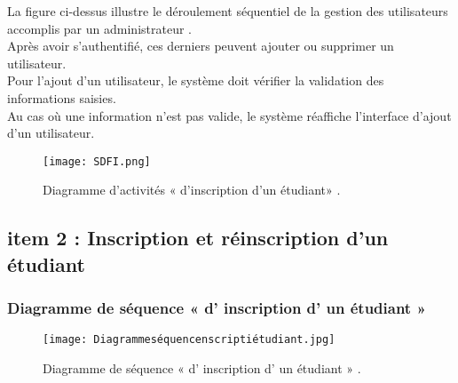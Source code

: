 La figure ci-dessus illustre le déroulement séquentiel de la gestion des utilisateurs accomplis par
un administrateur .\\
Après avoir s’authentifié, ces derniers peuvent ajouter ou supprimer un utilisateur.\\
Pour l’ajout d’un utilisateur, le système doit vérifier la validation des informations saisies.\\
 Au cas où une information n’est pas valide, le système réaffiche l’interface d’ajout d’un utilisateur.
 \begin{figure}[ht]
 	\centering
 	\texttt{[image: SDFI.png]}
 	\caption{Diagramme d'activités « d'inscription d'un étudiant» .}
 	\label{fig:Diagramme d' activités  d' inscription d'un étudiant   }
 \end{figure}
 \FloatBarrier
\clearpage
\subsection{item 2 : Inscription et réinscription d'un étudiant}
\subsubsection{Diagramme de séquence « d' inscription d' un étudiant » }
\begin{figure}[ht]
	\centering
	\texttt{[image: Diagrammeséquencenscriptiétudiant.jpg]}
	\caption{Diagramme de séquence « d' inscription d' un étudiant » .}
	\label{fig:Diagramme de séquence  d' inscription d' un étudiant   }
\end{figure}
\FloatBarrier


